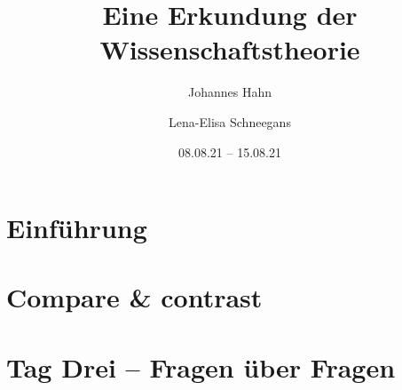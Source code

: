 \documentclass[fontsize=11pt,fleqn,a4paper]{scrartcl}
\author{Johannes Hahn \and Lena-Elisa Schneegans}
\title{Eine Erkundung der Wissenschaftstheorie}
\date{08.08.21 -- 15.08.21}
\begin{document}
\maketitle

\tableofcontents
\pagebreak
\section{Einführung}

\pagebreak

\section{Compare \& contrast}


\pagebreak
\section{Tag Drei -- Fragen über Fragen}

\end{document}
